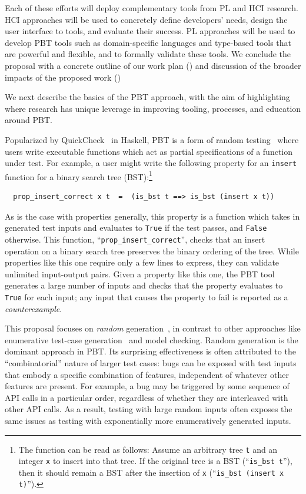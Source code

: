 Each of these efforts will deploy complementary tools from PL
and HCI research. HCI approaches will be used to concretely define developers' needs,
design the user interface to tools, and evaluate their success. PL approaches
will be used to develop PBT tools such as domain-specific languages and
type-based tools that are powerful and flexible, and to formally validate these
tools. We conclude the proposal with a concrete outline of our work plan
() and discussion of the broader impacts of the
proposed work ()

%
We next describe the basics of the PBT approach, with the aim of highlighting
where research has unique leverage in improving tooling, processes, and
education around PBT.

Popularized by QuickCheck~\cite{hughes2007quickcheck} in Haskell,
PBT is a form of random testing~\cite{hamlet1994random} where
users write executable functions which act as partial
specifications of a function under test. For example, a user might
write the following property for an \lstinline{insert}
function for a binary search tree (BST):\footnote{The function can be read as
follows:
Assume an arbitrary tree \texttt{t} and an integer
\texttt{x} to insert into that tree. If the original tree
is a BST (``\lstinline{is_bst t}''), then it should remain
a BST after the insertion of \texttt{x} (``\lstinline{is_bst (insert x t)}'').}
\begin{lstlisting}
  prop_insert_correct x t  =  (is_bst t ==> is_bst (insert x t))
\end{lstlisting}
As is the case with properties generally, this property is a function which
takes in generated
test inputs and evaluates to \lstinline{True} if the test passes, and
\lstinline{False} otherwise.  This function, ``\verb|prop_insert_correct|'',
checks
that an insert operation on a binary search tree preserves the
binary ordering of the tree.
While properties like this one require
only a few lines to express, they can validate unlimited
input-output pairs.  Given a property like this one, the PBT tool generates a
large number of inputs and
checks that the property evaluates to \lstinline{True} for each input; any input
that causes the property to fail is reported as a {\em counterexample}.

This proposal focuses on {\em random}
generation~\cite{hamlet1994random}, in contrast to other
approaches like enumerative test-case
generation~\cite{DBLP:conf/haskell/RuncimanNL08, leancheck} and model
checking. Random generation is the dominant approach in PBT. Its
surprising effectiveness is often attributed to the
``combinatorial'' nature of larger test cases: bugs can be
exposed with test inputs that embody a specific combination of features,
independent of whatever other features are present. For example,
a bug may be triggered by some sequence of API calls in a
particular order,
regardless of whether they are
interleaved with other API calls. As a result, testing with large random
inputs often exposes the same issues as testing with exponentially more
enumeratively generated inputs.

